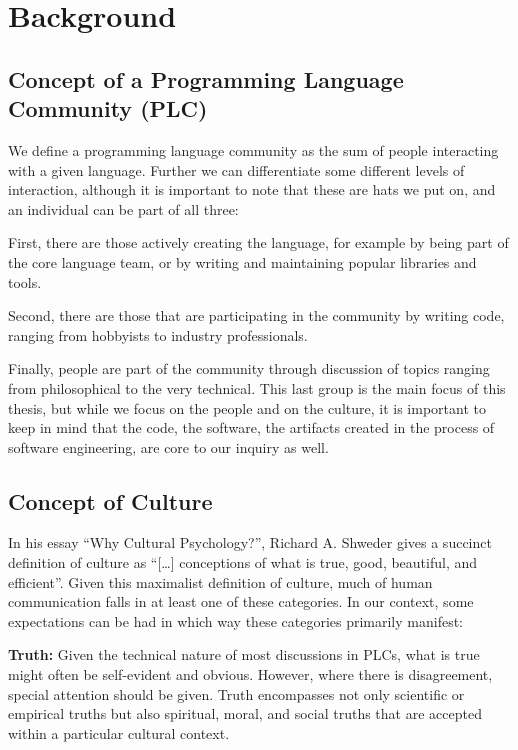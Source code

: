 \section{Background}

\subsection{Concept of a Programming Language Community (PLC)}

We define a programming language community as the sum of people interacting with a given language.
Further we can differentiate some different levels of interaction, although it is important to note
that these are hats we put on, and an individual can be part of all three:

First, there are those actively creating the language, for example by being part of the core language team, or by writing
and maintaining popular libraries and tools.

Second, there are those that are participating in the community by writing code, ranging from hobbyists to industry professionals.

Finally, people are part of the community through discussion of topics ranging from philosophical to the very technical.
This last group is the main focus of this thesis, but while we focus on the people and on the culture, it is important to
keep in mind that the code, the software, the artifacts created in the process of software engineering, are core to our inquiry as well.

\subsection{Concept of Culture}

In his essay “Why Cultural Psychology?”, Richard A. Shweder gives a succinct definition of culture as
“[\ldots] conceptions of what is true, good, beautiful, and efficient”. \cite[p.4]{schweder_why_cult} Given this maximalist definition of culture,
much of human communication falls in at least one of these categories. In our context, some expectations can be had in
which way these categories primarily manifest:

\textbf{Truth:} Given the technical nature of most discussions in PLCs, what is true might often be self-evident and obvious.
However, where there is disagreement, special attention should be given. Truth encompasses not only scientific or empirical
truths but also spiritual, moral, and social truths that are accepted within a particular cultural context.

